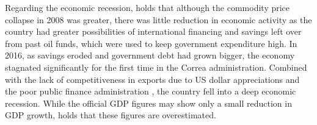 \documentclass[12pt,a4]{article}\usepackage[]{graphicx}\usepackage[]{xcolor}
\begin{document}
Regarding the economic recession, \textcite{Orozco.2015} holds that although the commodity price collapse in 2008 was greater, there was little reduction in economic activity as the country had greater possibilities of international financing and savings left over from past oil funds, which were used to keep government expenditure high. In 2016, as savings eroded and government debt had grown bigger, the economy stagnated significantly for the first time in the Correa administration. Combined with the lack of competitiveness in exports due to US dollar appreciations and the poor public finance administration \parencite{Hurtado.2018}, the country fell into a deep economic recession. While the official GDP figures may show only a small reduction in GDP growth, \textcite{Hurtado.2018} holds that these figures are overestimated.

\end{document}
